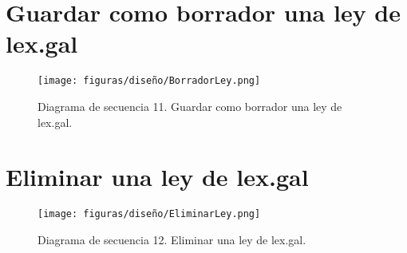 \section{Guardar como borrador una ley de lex.gal}

\begin{figure}[H]
\centerline{\texttt{[image: figuras/diseño/BorradorLey.png]}}
\caption{Diagrama de secuencia 11. Guardar como borrador una ley de lex.gal.}
\label{enlaceDValidarLEXGAL}
\end{figure}


\section{Eliminar una ley de lex.gal}

\begin{figure}[H]
\centerline{\texttt{[image: figuras/diseño/EliminarLey.png]}}
\caption{Diagrama de secuencia 12. Eliminar una ley de lex.gal.}
\label{enlaceDEliminarLEXGAL}
\end{figure}